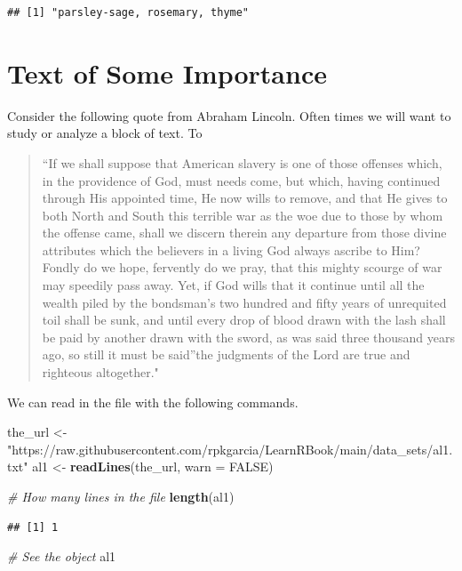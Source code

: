 \documentclass[
]{book}
\newenvironment{Shaded}{\begin{snugshade}}{\end{snugshade}}
\newcommand{\CommentTok}[1]{\textcolor[rgb]{0.56,0.35,0.01}{\textit{#1}}}
\newcommand{\DataTypeTok}[1]{\textcolor[rgb]{0.13,0.29,0.53}{#1}}
\newcommand{\KeywordTok}[1]{\textcolor[rgb]{0.13,0.29,0.53}{\textbf{#1}}}
\newcommand{\NormalTok}[1]{#1}
\newcommand{\OtherTok}[1]{\textcolor[rgb]{0.56,0.35,0.01}{#1}}
\newcommand{\StringTok}[1]{\textcolor[rgb]{0.31,0.60,0.02}{#1}}
\begin{document}
\begin{verbatim}
## [1] "parsley-sage, rosemary, thyme"
\end{verbatim}

\hypertarget{text-of-some-importance}{%
\section{Text of Some Importance}\label{text-of-some-importance}}

Consider the following quote from Abraham Lincoln. Often times we will want to study or analyze a block of text. To

\begin{quote}
``If we shall suppose that American slavery is one of those
offenses which, in the providence of God, must needs come, but which, having
continued through His appointed time, He now wills to remove, and that He
gives to both North and South this terrible war as the woe due to those by
whom the offense came, shall we discern therein any departure from those
divine attributes which the believers in a living God always ascribe to Him?
Fondly do we hope, fervently do we pray, that this mighty scourge of war may
speedily pass away. Yet, if God wills that it continue until all the wealth
piled by the bondsman's two hundred and fifty years of unrequited toil shall
be sunk, and until every drop of blood drawn with the lash shall be paid by
another drawn with the sword, as was said three thousand years ago, so still
it must be said''the judgments of the Lord are true and righteous
altogether."
\end{quote}

We can read in the file with the following commands.

\begin{Shaded}
\begin{Highlighting}[]
\NormalTok{the_url <-}\StringTok{ "https://raw.githubusercontent.com/rpkgarcia/LearnRBook/main/data_sets/al1.txt"}
\NormalTok{al1 <-}\StringTok{ }\KeywordTok{readLines}\NormalTok{(the_url, }\DataTypeTok{warn =} \OtherTok{FALSE}\NormalTok{)}

\CommentTok{# How many lines in the file}
\KeywordTok{length}\NormalTok{(al1)}
\end{Highlighting}
\end{Shaded}

\begin{verbatim}
## [1] 1
\end{verbatim}

\begin{Shaded}
\begin{Highlighting}[]
\CommentTok{# See the object}
\NormalTok{al1}
\end{Highlighting}
\end{Shaded}
\end{document}
